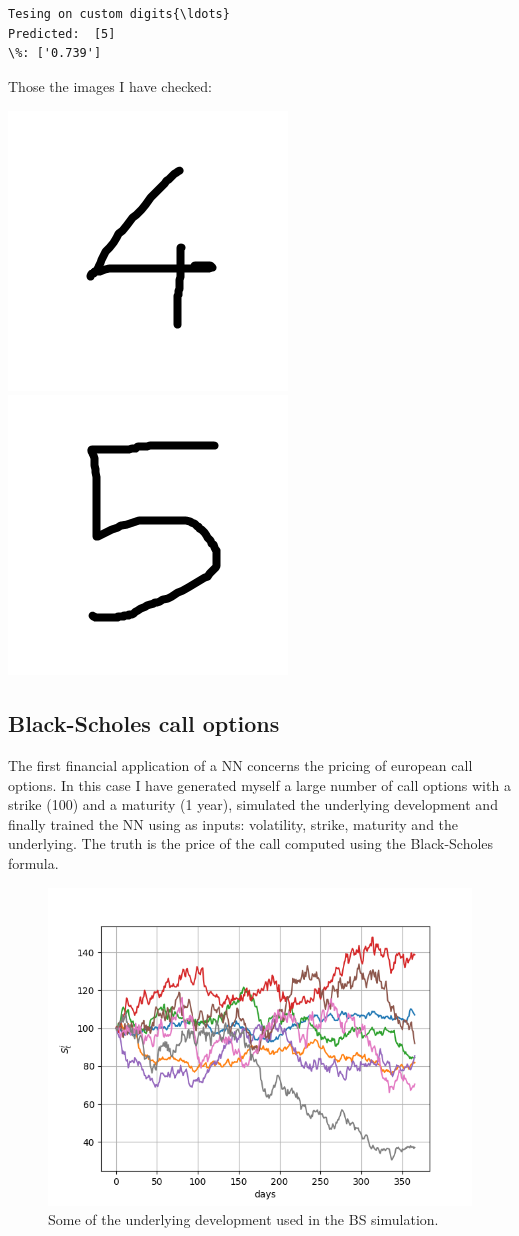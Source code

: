 \documentclass[11pt]{article}
\begin{document}
    \begin{Verbatim}[commandchars=\\\{\}]


Tesing on custom digits{\ldots}
Predicted:  [5]
\%: ['0.739']
    \end{Verbatim}

    Those the images I have checked:
    \begin{center}
    \includegraphics[width=0.2\linewidth]{four.png}
    \includegraphics[width=0.2\linewidth]{five.png}
    \end{center}
    
    \hypertarget{black-scholes-call-options}{%
\subsection{Black-Scholes call
options}\label{black-scholes-call-options}}

The first financial application of a NN concerns the pricing of european
call options. In this case I have generated myself a large number of
call options with a strike (100) and a maturity (1 year), simulated the
underlying development and finally trained the NN using as inputs:
volatility, strike, maturity and the underlying. The truth is the price
of the call computed using the Black-Scholes formula.

\begin{figure}
  \centering
  \includegraphics{underlyings.png}
  \caption{Some of the underlying development used in the BS simulation.}
\end{figure}
\end{document}
